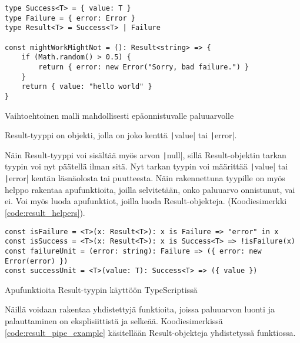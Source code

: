 \begin{code}
    \begin{verbatim}
type Success<T> = { value: T }
type Failure = { error: Error }
type Result<T> = Success<T> | Failure 

const mightWorkMightNot = (): Result<string> => {
    if (Math.random() > 0.5) {
        return { error: new Error("Sorry, bad failure.") }
    }
    return { value: "hello world" }
}
    \end{verbatim}
    \caption{Vaihtoehtoinen malli mahdollisesti epäonnistuvalle paluuarvolle}
    \label{code:ts_better_result_sum}
\end{code}


Result-tyyppi on objekti, jolla on joko kenttä \texttt|value| tai \texttt|error|.

Näin Result-tyyppi voi sisältää myös arvon \texttt|null|, sillä Result-objektin tarkan tyypin voi nyt päätellä ilman sitä. Nyt tarkan tyypin voi määrittää \texttt|value| tai \texttt|error| kentän läsnäolosta tai puutteesta. Näin rakennettuna tyypille on myös helppo rakentaa apufunktioita, joilla selvitetään, onko paluuarvo onnistunut, vai ei. Voi myös luoda apufunktiot, joilla luoda Result-objekteja. (Koodiesimerkki \ref{code:result_helpers}).

\begin{code}
    \begin{verbatim}
const isFailure = <T>(x: Result<T>): x is Failure => "error" in x
const isSuccess = <T>(x: Result<T>): x is Success<T> => !isFailure(x)
const failureUnit = (error: string): Failure => ({ error: new Error(error) })
const successUnit = <T>(value: T): Success<T> => ({ value })
    \end{verbatim}
    \caption{Apufunktioita Result-tyypin käyttöön TypeScriptissä}
    \label{code:result_helpers}
\end{code}

Näillä voidaan rakentaa yhdistettyjä funktioita, joissa paluuarvon luonti ja palauttaminen on eksplisiittistä ja selkeää. Koodiesimerkissä \ref{code:result_pipe_example} käsitellään Result-objekteja yhdistetyssä funktiossa.

